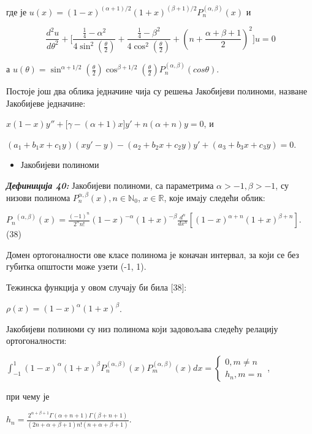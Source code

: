 где је
\(u(x) = {(1 - x)}^{(\alpha + 1)/2}{(1 + x)}^{(\beta + 1)/2}P_{n}^{(\alpha,\beta)}(x)\)
и

\[\frac{d^{2}u}{d\theta^{2}} + \lbrack\frac{\frac{1}{4} - \alpha^{2}}{4\sin^{2}(\frac{\theta}{2})} + \frac{\frac{1}{4} - \beta^{2}}{4\cos^{2}(\frac{\theta}{2})} + {(n + \frac{\alpha + \beta + 1}{2})}^{2}\rbrack u = 0\]

а
\(u(\theta) = \sin^{\alpha + 1/2}(\frac{\theta}{2})\cos^{\beta + 1/2}(\frac{\theta}{2})P_{n}^{(\alpha,\beta)}(cos\theta)\).

Постоје још два облика једначине чија су решења Јакобијеви полиноми,
назване Јакобијеве једначине:

\(x(1 - x)y^{}'' + \lbrack\gamma - (\alpha + 1)x\rbrack y' + n(\alpha + n)y = 0\),
и

\((a_{1} + b_{1}x + c_{1}y)(xy' - y) - (a_{2} + b_{2}x + c_{2}y)y' + (a_{3} + b_{3}x + c_{3}y) = 0\).

\begin{itemize}
\item
  Јакобијеви полиноми
\end{itemize}

\emph{\textbf{Дефиниција 40:}} Јакобијеви полиноми, са параметрима
\(\alpha > - 1,\beta > - 1\), су низови полинома
\(P_{n}^{\alpha,\beta}(x),n \in \mathbb{N}_{0}\), \(x\mathbb{\in R}\),
које имају следећи облик:

\({P_{n}}^{(\alpha,\beta)}(x) = \frac{{( - 1)}^{n}}{2^{n}n!}{(1 - x)}^{- \alpha}{(1 + x)}^{- \beta}\frac{d^{n}}{dx^{n}}\left\lbrack {(1 - x)}^{\alpha + n}{(1 + x)}^{\beta + n} \right\rbrack\).
(38)

Домен ортогоналности ове класе полинома је коначан интервал, за који се
без губитка општости може узети (-1, 1).

Тежинска функција у овом случају би била {[}38{]}:

\(\rho(x) = {(1 - x)}^{\alpha}{(1 + x)}^{\beta}\).

Јакобијеви полиноми су низ полинома који задовољава следећу релацију
ортогоналности:

\(\int_{- 1}^{1}{(1 - x)}^{\alpha}{(1 + x)}^{\beta}P_{n}^{(\alpha,\beta)}(x)P_{m}^{(\alpha,\beta)}(x)dx = \left\{ \begin{array}{r}
0,m \neq n \\
h_{n},m = n
\end{array} \right.\ \),

при чему је

\(h_{n} = \frac{2^{\alpha + \beta + 1}\Gamma(\alpha + n + 1)\Gamma(\beta + n + 1)}{(2n + \alpha + \beta + 1)n!(n + \alpha + \beta + 1)}\).

